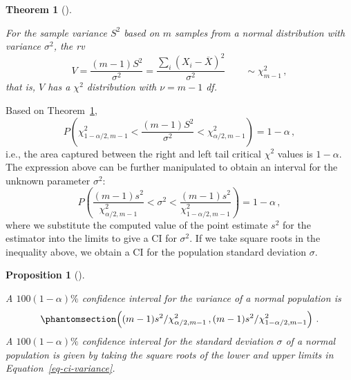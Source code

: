 \documentclass[
  a4paper,
  DIV=11,
  numbers=noendperiod,
  oneside]{scrreprt}
\theoremstyle{definition}
\theoremstyle{definition}
\theoremstyle{plain}
\newtheorem{proposition}{Proposition}[chapter]
\theoremstyle{plain}
\newtheorem{theorem}{Theorem}[chapter]
\theoremstyle{definition}
\theoremstyle{remark}
\begin{document}
\begin{theorem}[]\protect\hypertarget{thm-samp-var-chisq}{}\label{thm-samp-var-chisq}

For the sample variance \(S^2\) based on \(m\) samples from a normal
distribution with variance \(\sigma^2\), the rv \[
V = \frac{(m-1)S^2}{\sigma^2} = \frac{\sum_i(X_i - \overline{X})^2}{\sigma^2} \qquad \sim \chi^2_{m-1}\,,
\] that is, \(V\) has a \(\chi^2\) distribution with \(\nu = m-1\) df.

\end{theorem}

Based on Theorem~\ref{thm-samp-var-chisq}, \[
P\left(\chi^2_{1-\alpha/2, m-1} < \frac{(m-1)S^2}{\sigma^2} < \chi^2_{\alpha/2, m-1} \right) = 1 - \alpha \,,
\] i.e., the area captured between the right and left tail critical
\(\chi^2\) values is \(1-\alpha.\) The expression above can be further
manipulated to obtain an interval for the unknown parameter
\(\sigma^2\): \[
P\left(\frac{(m-1) s^2}{\chi^2_{\alpha/2, m-1}} < \sigma^2 < \frac{(m-1) s^2}{\chi^2_{1-\alpha/2, m-1}} \right) = 1 - \alpha \,,
\] where we substitute the computed value of the point estimate \(s^2\)
for the estimator into the limits to give a CI for \(\sigma^2.\) If we
take square roots in the inequality above, we obtain a CI for the
population standard deviation \(\sigma.\)

\begin{proposition}[]\protect\hypertarget{prp-ci-variance}{}\label{prp-ci-variance}

A \(100(1-\alpha)\%\) confidence interval for the variance of a normal
population is \begin{equation}\phantomsection\label{eq-ci-variance}{
 \left( (m-1)s^2 / \chi^2_{\alpha/2, m-1} \,,  (m-1)s^2 / \chi^2_{1-\alpha/2, m-1} \right) \,.
}\end{equation} A \(100(1-\alpha)\%\) confidence interval for the
standard deviation \(\sigma\) of a normal population is given by taking
the square roots of the lower and upper limits in
Equation~\ref{eq-ci-variance}.

\end{proposition}
\end{document}
